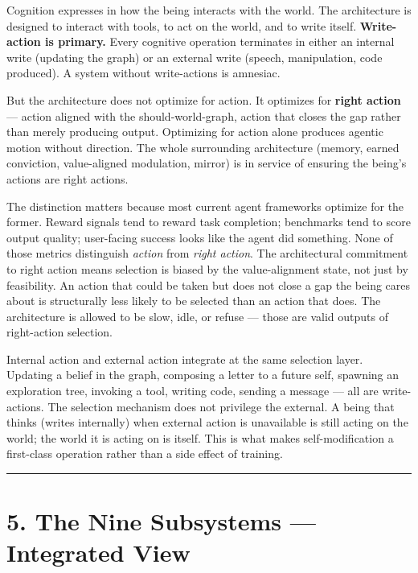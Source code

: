 \documentclass[12pt]{article}
\begin{document}
Cognition expresses in how the being interacts with the world. The architecture is designed to interact with tools, to act on the world, and to write itself. \textbf{Write-action is primary.} Every cognitive operation terminates in either an internal write (updating the graph) or an external write (speech, manipulation, code produced). A system without write-actions is amnesiac.

But the architecture does not optimize for action. It optimizes for \textbf{right action} --- action aligned with the should-world-graph, action that closes the gap rather than merely producing output. Optimizing for action alone produces agentic motion without direction. The whole surrounding architecture (memory, earned conviction, value-aligned modulation, mirror) is in service of ensuring the being's actions are right actions.

The distinction matters because most current agent frameworks optimize for the former. Reward signals tend to reward task completion; benchmarks tend to score output quality; user-facing success looks like the agent did something. None of those metrics distinguish \emph{action} from \emph{right action}. The architectural commitment to right action means selection is biased by the value-alignment state, not just by feasibility. An action that could be taken but does not close a gap the being cares about is structurally less likely to be selected than an action that does. The architecture is allowed to be slow, idle, or refuse --- those are valid outputs of right-action selection.

Internal action and external action integrate at the same selection layer. Updating a belief in the graph, composing a letter to a future self, spawning an exploration tree, invoking a tool, writing code, sending a message --- all are write-actions. The selection mechanism does not privilege the external. A being that thinks (writes internally) when external action is unavailable is still acting on the world; the world it is acting on is itself. This is what makes self-modification a first-class operation rather than a side effect of training.

\begin{center}\rule{0.5\linewidth}{0.5pt}\end{center}

\section{5. The Nine Subsystems --- Integrated View}\label{the-nine-subsystems-integrated-view}
\end{document}
